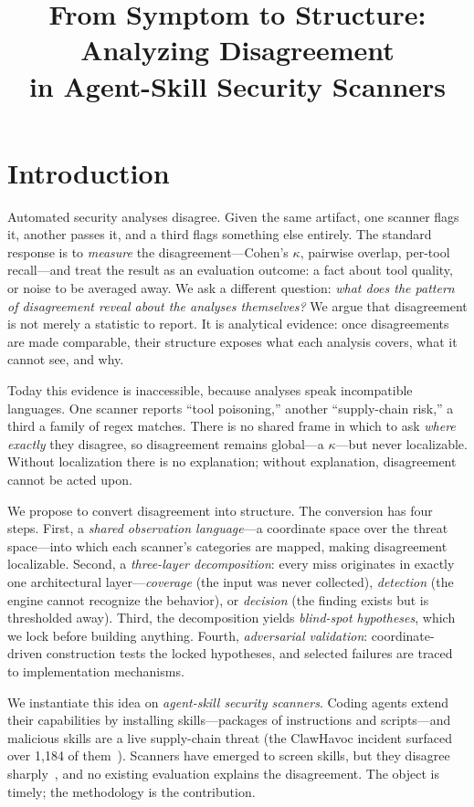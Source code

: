 \documentclass[sigconf,nonacm]{acmart}
\title{From Symptom to Structure: Analyzing Disagreement\\in Agent-Skill Security Scanners}
\begin{document}
\maketitle

\section{Introduction}
\label{sec:intro}

Automated security analyses disagree.
Given the same artifact, one scanner flags it, another passes it, and a third flags something else entirely.
The standard response is to \emph{measure} the disagreement---Cohen's $\kappa$, pairwise overlap, per-tool recall---and treat the result as an evaluation outcome: a fact about tool quality, or noise to be averaged away.
We ask a different question: \emph{what does the pattern of disagreement reveal about the analyses themselves?}
We argue that disagreement is not merely a statistic to report.
It is analytical evidence: once disagreements are made comparable, their structure exposes what each analysis covers, what it cannot see, and why.

Today this evidence is inaccessible, because analyses speak incompatible languages.
One scanner reports ``tool poisoning,'' another ``supply-chain risk,'' a third a family of regex matches.
There is no shared frame in which to ask \emph{where exactly} they disagree, so disagreement remains global---a $\kappa$---but never localizable.
Without localization there is no explanation; without explanation, disagreement cannot be acted upon.

We propose to convert disagreement into structure.
The conversion has four steps.
First, a \emph{shared observation language}---a coordinate space over the threat space---into which each scanner's categories are mapped, making disagreement localizable.
Second, a \emph{three-layer decomposition}: every miss originates in exactly one architectural layer---\emph{coverage} (the input was never collected), \emph{detection} (the engine cannot recognize the behavior), or \emph{decision} (the finding exists but is thresholded away).
Third, the decomposition yields \emph{blind-spot hypotheses}, which we lock before building anything.
Fourth, \emph{adversarial validation}: coordinate-driven construction tests the locked hypotheses, and selected failures are traced to implementation mechanisms.

We instantiate this idea on \emph{agent-skill security scanners}.
Coding agents extend their capabilities by installing skills---packages of instructions and scripts---and malicious skills are a live supply-chain threat (the ClawHavoc incident surfaced over 1{,}184 of them~\cite{clawhub2026}).
Scanners have emerged to screen skills, but they disagree sharply~\cite{clawhub2026,locatejudge2026}, and no existing evaluation explains the disagreement.
The object is timely; the methodology is the contribution.
\end{document}

